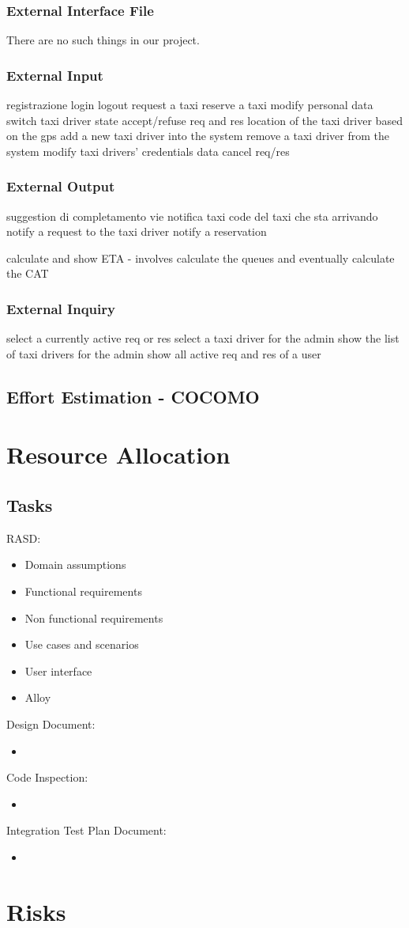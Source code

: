 \documentclass{article}
\begin{document}
\subsubsection{External Interface File}
There are no such things in our project.
\subsubsection{External Input}
registrazione
login
logout
request a taxi
reserve a taxi
modify personal data
switch taxi driver state
accept/refuse req and res
location of the taxi driver based on the gps
add a new taxi driver into the system
remove a taxi driver from the system
modify taxi drivers' credentials data
cancel req/res
\subsubsection{External Output}
suggestion di completamento vie
notifica taxi code del taxi che sta arrivando
notify a request to the taxi driver
notify a reservation

calculate and show ETA - involves calculate the queues and eventually calculate the CAT
\subsubsection{External Inquiry}
select a currently active req or res
select a taxi driver for the admin
show the list of taxi drivers for the admin
show all active req and res of a user
\subsection{Effort Estimation - COCOMO}
\section{Resource Allocation}
\subsection{Tasks}
RASD:
\begin{itemize}
	\item Domain assumptions
	\item Functional requirements
	\item Non functional requirements
	\item Use cases and scenarios
	\item User interface
	\item Alloy
\end{itemize}
Design Document:
\begin{itemize}
	\item
\end{itemize}
Code Inspection:
\begin{itemize}
	\item
\end{itemize}
Integration Test Plan Document:
\begin{itemize}
	\item 
\end{itemize}
\section{Risks}
\end{document}
